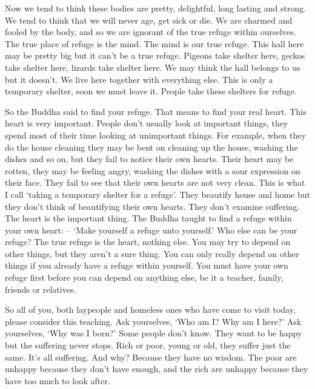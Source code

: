 Now we tend to think these bodies are pretty, delightful, long lasting and strong. We tend to think that we will never age, get sick or die. We are charmed and fooled by the body, and so we are ignorant of the true refuge within ourselves. The true place of refuge is the mind. The mind is our true refuge. This hall here may be pretty big but it can't be a true refuge. Pigeons take shelter here, geckos take shelter here, lizards take shelter here. We may think the hall belongs to us but it doesn't. We live here together with everything else. This is only a temporary shelter, soon we must leave it. People take these shelters for refuge. 

So the Buddha said to find your refuge. That means to find your real heart. This heart is very important. People don't usually look at important things, they spend most of their time looking at unimportant things. For example, when they do the house cleaning they may be bent on cleaning up the house, washing the dishes and so on, but they fail to notice their own hearts. Their heart may be rotten, they may be feeling angry, washing the dishes with a sour expression on their face. They fail to see that their own hearts are not very clean. This is what I call `taking a temporary shelter for a refuge'. They beautify house and home but they don't think of beautifying their own hearts. They don't examine suffering. The heart is the important thing. The Buddha taught to find a refuge within your own heart:  -- `Make yourself a refuge unto yourself.' Who else can be your refuge? The true refuge is the heart, nothing else. You may try to depend on other things, but they aren't a sure thing. You can only really depend on other things if you already have a refuge within yourself. You must have your own refuge first before you can depend on anything else, be it a teacher, family, friends or relatives. 

So all of you, both laypeople and homeless ones who have come to visit today, please consider this teaching. Ask yourselves, `Who am I? Why am I here?' Ask yourselves, `Why was I born?' Some people don't know. They want to be happy but the suffering never stops. Rich or poor, young or old, they suffer just the same. It's all suffering. And why? Because they have no wisdom. The poor are unhappy because they don't have enough, and the rich are unhappy because they have too much to look after. 

